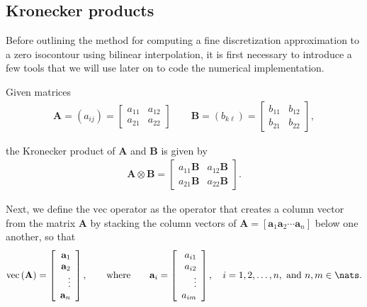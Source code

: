 \documentclass{article}
\begin{document}
\subsection{Kronecker products}
\label{sec:kronecker-products}

Before outlining the method for computing a fine discretization
approximation to a zero isocontour using bilinear interpolation,
it is first necessary to introduce a few tools that we will use
later on to code the numerical implementation.

Given matrices
\begin{align*}
  \mathbf{A} = (a_{ij}) =
  \left[\begin{array}{rr}
    a_{11} & a_{12}\\
    a_{21} & a_{22}
  \end{array}\right]
\qquad
\mathbf{B} = (b_{k\ell}) =
\left[\begin{array}{rr}
  b_{11} & b_{12} \\
  b_{21} & b_{22}
\end{array}\right],
\end{align*}

the Kronecker product of $\mathbf{A}$ and $\mathbf{B}$ is
given by
\begin{align*}
  \mathbf{A} \otimes \mathbf{B} = \left[
    \begin{array}{rr}
      a_{11} \mathbf{B} & a_{12}\mathbf{B} \\
      a_{21} \mathbf{B} & a_{22} \mathbf{B}
    \end{array}
\right].
\end{align*}

Next, we define the $\mathrm{vec}$ operator as the operator
that creates a column vector from the matrix $\mathbf{A}$ by
stacking the column vectors of $\mathbf{A} = \left[\mathbf{a}_1
  \mathbf{a}_2\cdots \mathbf{a}_n\right]$ below one another, so
that
\begin{align*}
  \mathrm{vec}\left(\mathbf{A}\right) = 
\left[
  \begin{array}{r}
    \mathbf{a}_1\\
    \mathbf{a}_2\\
    \vdots\\
    \mathbf{a}_n
  \end{array}
\right], \qquad 
\text{where} \qquad \mathbf{a}_i = \left[
  \begin{array}{r}
    a_{i1}\\
    a_{i2}\\
    \vdots\\
    a_{im}
  \end{array}
\right], \quad i = 1, 2, \ldots, n, \text{ and } n, m \in \nats.
\end{align*}
\end{document}

